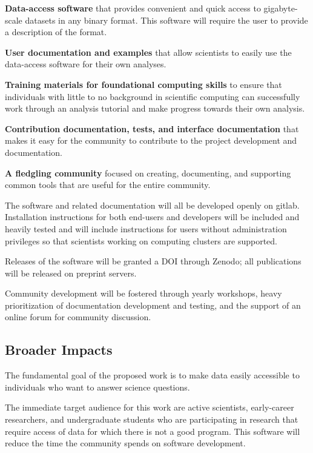 \textbf{Data-access software} that provides convenient and quick access to gigabyte-scale datasets in any binary format.  This software will require the user to provide a description of the format.

\textbf{User documentation and examples} that allow scientists to easily use the data-access software for their own analyses.

\textbf{Training materials for foundational computing skills} to ensure that individuals with little to no background in scientific computing can successfully work through an analysis tutorial and make progress towards their own analysis.

\textbf{Contribution documentation, tests, and interface documentation} that makes it easy for the community to contribute to the project development and documentation.

\textbf{A fledgling community} focused on creating, documenting, and supporting common tools that are useful for the entire community.

The software and related documentation will all be developed openly on gitlab.  Installation instructions for both end-users and developers will be included and heavily tested and will include instructions for users without administration privileges so that scientists working on computing clusters are supported.

Releases of the software will be granted a DOI through Zenodo; all publications will be released on preprint servers.

Community development will be fostered through yearly workshops, heavy prioritization of documentation development and testing, and the support of an online forum for community discussion.

\subsection{Broader Impacts}
\label{sec:broad}

The fundamental goal of the proposed work is to make data easily accessible to individuals who want to answer science questions.


The immediate target audience for this work are active scientists, early-career researchers, and undergraduate students who are participating in research that require access of data for which there is not a good program.  This software will reduce the time the community spends on software development.  

